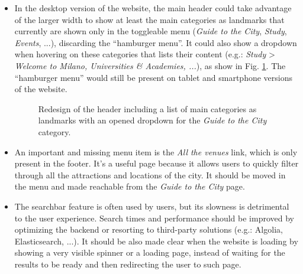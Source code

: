 \begin{itemize}
    \item In the desktop version of the website, the main header could take advantage of the larger width to show at least the main categories as landmarks that currently are shown only in the toggleable menu (\emph{Guide to the City}, \emph{Study}, \emph{Events}, ...), discarding the ``hamburger menu''. It could also show a dropdown when hovering on these categories that lists their content (e.g.: \emph{Study} > \emph{Welcome to Milano, Universities \& Academies, ...}), as show in Fig. \ref{fig:redesign-1}. The ``hamburger menu'' would still be present on tablet and smartphone versions of the website.
    \begin{figure}[!ht]
        \begin{minipage}{\linewidth}
            \centering
            \captionsetup{justification=centering}
            \caption{Redesign of the header including a list of main categories as landmarks with an opened dropdown for the \emph{Guide to the City} category.}
            \label{fig:redesign-1}
        \end{minipage}
    \end{figure}

    \item An important and missing menu item is the \emph{All the venues} link, which is only present in the footer. It's a useful page because it allows users to quickly filter through all the attractions and locations of the city. It should be moved in the menu and made reachable from the \emph{Guide to the City} page.
    
    \item The searchbar feature is often used by users, but its slowness is detrimental to the user experience. Search times and performance should be improved by optimizing the backend or resorting to third-party solutions (e.g.: Algolia, Elasticsearch, ...). It should be also made clear when the website is loading by showing a very visible spinner or a loading page, instead of waiting for the results to be ready and then redirecting the user to such page.
    

\end{itemize}
